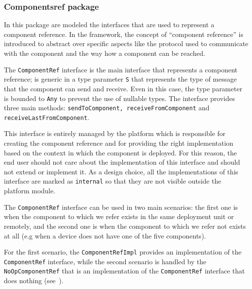 \subsubsection{Componentsref package}

In this package are modeled the interfaces that are used to represent a component reference.
In the framework, the concept of ``component reference'' is introduced to abstract over specific aspects like the protocol used to communicate with
the component and the way how a component can be reached.



The \texttt{ComponentRef} interface is the main interface that represents a component reference; is generic in a type parameter \texttt{S} that
represents the type of message that the component can send and receive. Even in this case, the type parameter is bounded to \texttt{Any} to prevent
the use of nullable types. The interface provides three main methods: \texttt{sendToComponent, receiveFromComponent} and
\texttt{receiveLastFromComponent}.

This interface is entirely managed by the platform which is responsible for creating the component reference and for providing the right
implementation based on the context in which the component is deployed. For this reason, the end user should not care about the implementation
of this interface and should not extend or implement it. As a design choice, all the implementations of this interface are marked as
\texttt{internal} so that they are not visible outside the platform module.

The \texttt{ComponentRef} interface can be used in two main scenarios: the first one is when the component to which we refer exists in the same
deployment unit or remotely, and the second one is when the component to which we refer not exists at all (e.g when a device does not have one of the
five components).

For the first scenario, the \texttt{ComponentRefImpl} provides an implementation of the \texttt{ComponentRef} interface, while the second scenario is
handled by the \texttt{NoOpComponentRef} that is an implementation of the \texttt{ComponentRef} interface that does nothing
(see~).

